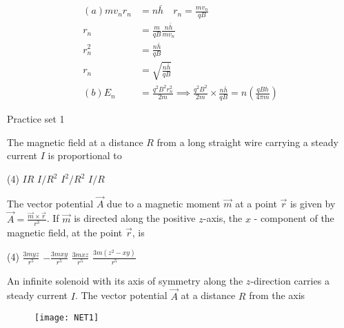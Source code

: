 \begin{answer}
\begin{align*}
(a)mv_nr_n&=n\bar{h} \quad r_n=\frac{mv_n}{qB}\\
r_n&=\frac{m}{qB}\frac{n\bar{h}}{mv_n}\\
r_n^2&=\frac{n\bar{h}}{qB}\\
r_n&=\sqrt{\frac{n\bar{h}}{qB}}\\
(b) E_n&=\frac{q^2B^2r^2_n}{2m}\implies \frac{q^2B^2}{2m}\times\frac{n\bar{h}}{qB}=n\left( \frac{qBh}{4\pi m}\right)  
\end{align*}
\end{answer}
\newpage
\begin{abox}
	Practice set 1
	\end{abox}
\begin{enumerate}
\begin{minipage}{\textwidth}
	\item The magnetic field at a distance $R$ from a long straight wire carrying a steady current $I$ is proportional to
\end{minipage}
\begin{tasks}(4)
	\task[\textbf{A.}] $I R$
	\task[\textbf{B.}] $I / R^{2}$
	\task[\textbf{C.}]$I^{2} / R^{2}$
	\task[\textbf{D.}]$I / R$
\end{tasks}
\begin{minipage}{\textwidth}
	\item The vector potential $\vec{A}$ due to a magnetic moment $\vec{m}$ at a point $\vec{r}$ is given by $\vec{A}=\frac{\vec{m} \times \vec{r}}{r^{3}}$.
	If $\vec{m}$ is directed along the positive $z$-axis, the $x$ - component of the magnetic field, at the point $\vec{r}$, is
\end{minipage}
\begin{tasks}(4)
	\task[\textbf{A.}] $\frac{3 m y z}{r^{5}}$
	\task[\textbf{B.}] $-\frac{3 m x y}{r^{5}}$
	\task[\textbf{C.}]$\frac{3 m x z}{r^{5}}$
	\task[\textbf{D.}]$\frac{3 m\left(z^{2}-x y\right)}{r^{5}}$
\end{tasks}
\begin{minipage}{\textwidth}
	\item An infinite solenoid with its axis of symmetry along the $z$-direction carries a steady current $I$.
	The vector potential $\vec{A}$ at a distance $R$ from the axis
	\begin{figure}[H]
		\centering
		\texttt{[image: NET1]}
	\end{figure}

\end{minipage}
\end{enumerate}
